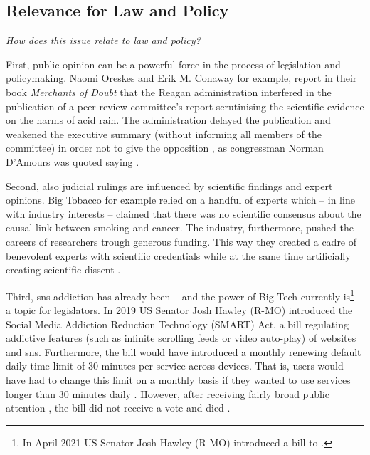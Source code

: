 \subsection{Relevance for Law and Policy}
\textit{How does this issue relate to law and policy?}

First, public opinion can be a powerful force in the process of legislation and policymaking. 
Naomi Oreskes and Erik M. Conaway for example, report in their book \emph{Merchants of Doubt} that the Reagan administration interfered in the publication of a peer review committee's report scrutinising the scientific evidence on the harms of acid rain.
The administration delayed the publication and weakened the executive summary (without informing all members of the committee) in order not to give the opposition , as congressman Norman D'Amours was quoted saying \citep[p 95 ff]{oreskes_merchants_2010}.

Second, also judicial rulings are influenced by scientific findings and expert opinions. 
Big Tobacco for example relied on a handful of experts which -- in line with industry interests -- claimed that there was no scientific consensus about the causal link between smoking and cancer. 
The industry, furthermore, pushed the careers of  researchers trough generous funding.
This way they created a cadre of benevolent experts with scientific credentials while at the same time artificially creating scientific dissent \citep{oreskes_merchants_2010}.

Third, \gls{sns} addiction has already been -- and the power of Big Tech currently is\footnote{In April 2021 US Senator Josh Hawley (R-MO) introduced a bill to  \citep{govtrackus_bust_2021}.} -- a topic for legislators.
In 2019 US Senator Josh Hawley (R-MO) introduced the Social Media Addiction Reduction Technology (SMART) Act, a bill regulating addictive features (such as infinite scrolling feeds or video auto-play) of websites and \gls{sns}.
Furthermore, the bill would have introduced a monthly renewing default daily time limit of 30 minutes per service across devices. That is, users would have had to change this limit on a monthly basis if they wanted to use services longer than 30 minutes daily \citep{hawley_social_2019}.
However, after receiving fairly broad public attention \citep{rosen_smart_2019, chen_new_2019, clukey_lawmaker_2019}, the bill did not receive a vote and died \citep{govtrackus_smart_nodate}.


